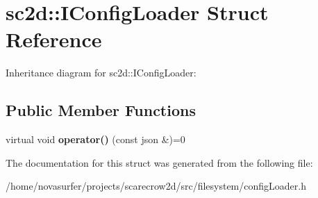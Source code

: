 \hypertarget{structsc2d_1_1IConfigLoader}{}\section{sc2d\+:\+:I\+Config\+Loader Struct Reference}
\label{structsc2d_1_1IConfigLoader}


Inheritance diagram for sc2d\+:\+:I\+Config\+Loader\+:
\subsection*{Public Member Functions}
\begin{DoxyCompactItemize}
\item 
\mbox{\label{structsc2d_1_1IConfigLoader_adc4142d9c020caec590789d5fe8abd69}} 
virtual void {\bfseries operator()} (const json \&)=0
\end{DoxyCompactItemize}


The documentation for this struct was generated from the following file\+:\begin{DoxyCompactItemize}
\item 
/home/novasurfer/projects/scarecrow2d/src/filesystem/config\+Loader.\+h\end{DoxyCompactItemize}
